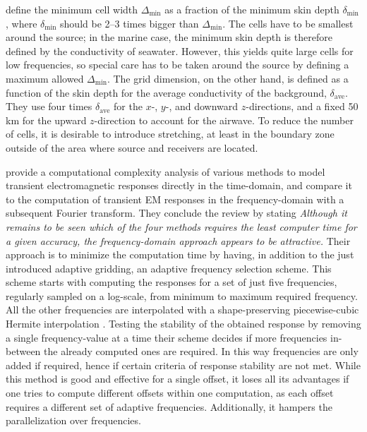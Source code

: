 \documentclass[extra, camera,%
    referee,     %
]{gji}
\begin{document}
\cite{GEO.07.Plessix} define the minimum cell width $\Delta_\mathrm{min}$ as a
fraction of the minimum skin depth $\delta_\mathrm{min}$, where
$\delta_\mathrm{min}$ should be 2--3 times bigger than $\Delta_\mathrm{min}$.
The cells have to be smallest around the source; in the marine case, the
minimum skin depth is therefore defined by the conductivity of seawater.
However, this yields quite large cells for low frequencies, so special care has
to be taken around the source by defining a maximum allowed
$\Delta_\mathrm{min}$. The grid dimension, on the other hand, is defined as a
function of the skin depth for the average conductivity of the background,
$\delta_\mathrm{ave}$. They use four times $\delta_\mathrm{ave}$ for the $x$-,
$y$-, and downward $z$-directions, and a fixed 50\,km for the upward
$z$-direction to account for the airwave. To reduce the number of cells, it is
desirable to introduce stretching, at least in the boundary zone outside of the
area where source and receivers are located.

\cite{GEO.08.Mulder} provide a computational complexity analysis of various
methods to model transient electromagnetic responses directly in the
time-domain, and compare it to the computation of transient EM responses in the
frequency-domain with a subsequent Fourier transform. They conclude the review
by stating \emph{\guillemotleft Although it remains to be seen which of the
four methods requires the least computer time for a given accuracy, the
frequency-domain approach appears to be attractive.\guillemotright} Their
approach is to minimize the computation time by having, in addition to the just
introduced adaptive gridding, an adaptive frequency selection scheme. This
scheme starts with computing the responses for a set of just five frequencies,
regularly sampled on a log-scale, from minimum to maximum required frequency.
All the other frequencies are interpolated with a shape-preserving
piecewise-cubic Hermite interpolation \citep[PCHIP, ][]{SIAM.80.Fritsch}.
Testing the stability of the obtained response by removing a single
frequency-value at a time their scheme decides if more frequencies in-between
the already computed ones are required. In this way frequencies are only added
if required, hence if certain criteria of response stability are not met. While
this method is good and effective for a single offset, it loses all its
advantages if one tries to compute different offsets within one computation, as
each offset requires a different set of adaptive frequencies. Additionally, it
hampers the parallelization over frequencies.
\end{document}
